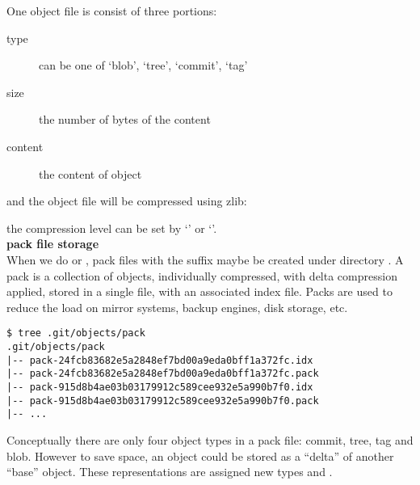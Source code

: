 One object file is consist of three portions:
\begin{description}
  \item[type] can be one of `blob', `tree', `commit', `tag'
  \item[size] the number of bytes of the content
  \item[content] the content of object
\end{description}

and the object file will be compressed using zlib:


the compression level can be set by `\textbf{}' or `\textbf{}'.
\\

\textbullet\textbf{\large{ pack file storage}}\\

When we do \emph{} or \emph{}, pack files with the suffix 
maybe be created under directory \emph{}. A pack is a collection of objects,
individually compressed, with delta compression applied, stored in a single file, with an associated
index file. Packs are used to reduce the load on mirror systems, backup engines, disk storage, etc.

\begin{lstlisting}[basicstyle=\ttfamily]
$ tree .git/objects/pack
.git/objects/pack
|-- pack-24fcb83682e5a2848ef7bd00a9eda0bff1a372fc.idx
|-- pack-24fcb83682e5a2848ef7bd00a9eda0bff1a372fc.pack
|-- pack-915d8b4ae03b03179912c589cee932e5a990b7f0.idx
|-- pack-915d8b4ae03b03179912c589cee932e5a990b7f0.pack
|-- ...
\end{lstlisting}

Conceptually there are only four object types in a pack file: commit, tree, tag and blob.
However to save space, an object could be stored as a ``delta'' of another ``base'' object.
These representations are assigned new types  and .

